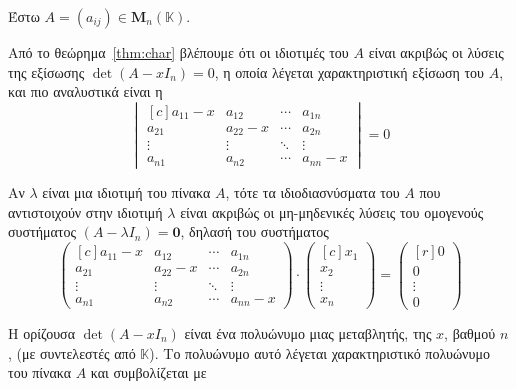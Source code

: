 \begin{rem}
  Έστω $ A = (a_{ij}) \in \textbf{M}_{n}(\mathbb{K}) $. 
  \begin{myitemize}
    \item Από το θεώρημα~\ref{thm:char} βλέπουμε ότι οι ιδιοτιμές του $A$ είναι 
      ακριβώς οι λύσεις της εξίσωσης $ \det(A-xI_{n}) = 0 $, η οποία λέγεται 
      \textcolor{Col1}{χαρακτηριστική εξίσωση} του $A$, και πιο αναλυστικά είναι η
      \[
        \begin{vmatrix*}[c]
          a_{11}-x & a_{12} & \cdots & a_{1n} \\
          a_{21} & a_{22}-x & \cdots & a_{2n} \\
          \vdots & \vdots & \ddots & \vdots \\
          a_{n1} & a_{n2} & \cdots & a_{nn} - x
        \end{vmatrix*} = 0
      \] 
    \item Αν $\lambda$ είναι μια ιδιοτιμή του πίνακα $A$, τότε τα ιδιοδιασνύσματα 
      του $A$ που αντιστοιχούν στην ιδιοτιμή $\lambda$ είναι ακριβώς οι
      \textcolor{Col1}{μη-μηδενικές} λύσεις του ομογενούς συστήματος 
      $ (A- \lambda I_{n}) = \mathbf{0} $, δηλασή του συστήματος 
      \[
        \begin{pmatrix*}[c]
          a_{11}-x & a_{12} & \cdots & a_{1n} \\
          a_{21} & a_{22}-x & \cdots & a_{2n} \\
          \vdots & \vdots & \ddots & \vdots \\
          a_{n1} & a_{n2} & \cdots & a_{nn} - x
        \end{pmatrix*} \cdot 
        \begin{pmatrix*}[c]
          x_{1} \\
          x_{2} \\
          \vdots \\
          x_{n}
        \end{pmatrix*} = 
        \begin{pmatrix*}[r]
          0 \\ 0 \\ \vdots \\ 0
        \end{pmatrix*}
      \]
    \item Η ορίζουσα $ \det(A-xI_{n}) $ είναι ένα πολυώνυμο μιας μεταβλητής, της $x$, 
      βαθμού $n$, (με συντελεστές από $ \mathbb{K} $). Το πολυώνυμο αυτό λέγεται 
      \textcolor{Col1}{χαρακτηριστικό πολυώνυμο} του πίνακα $A$ και συμβολίζεται με 

\end{myitemize}
\end{rem}
